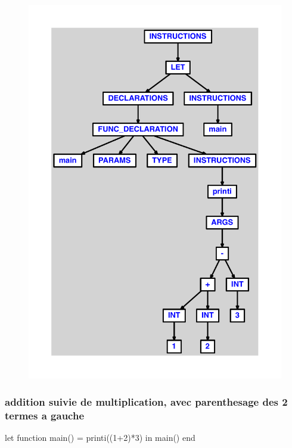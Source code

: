 \documentclass{article}
\begin{document}
\begin{figure}[H]\centering\includegraphics[max width=\textwidth]{ast/ast_96.pdf}\end{figure}\subsubsection{addition suivie de multiplication, avec parenthesage des 2 termes a gauche}
\begin{verbatimtab}
let function main() = printi((1+2)*3) in main() end
\end{verbatimtab}
\end{document}
